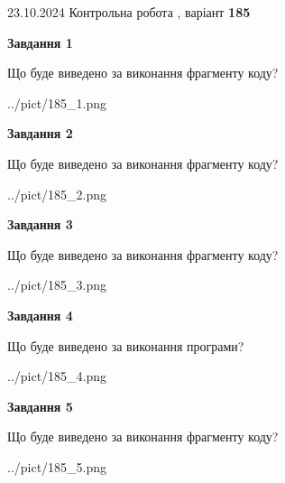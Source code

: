 \documentclass[12pt, ukrainian]{article}
\begin{document}
{\Large{23.10.2024 Контрольна робота , варіант  \No \textbf { 185 }\par}}
{
\begin {large}
{\begin {center}\textbf{Завдання 1}\end {center}}

Що буде виведено за виконання фрагменту коду?\par
\begin{center}
	{../pict/185_1.png}
\end{center}
\newpage

{\begin {center}\textbf{Завдання 2}\end {center}}

Що буде виведено за виконання фрагменту коду?\par
\begin{center}
	{../pict/185_2.png}
\end{center}
\newpage

{\begin {center}\textbf{Завдання 3}\end {center}}

Що буде виведено за виконання фрагменту коду?\par
\begin{center}
	{../pict/185_3.png}
\end{center}
\newpage

{\begin {center}\textbf{Завдання 4}\end {center}}

Що буде виведено за виконання програми?\par
\begin{center}
	{../pict/185_4.png}
\end{center}
\newpage

{\begin {center}\textbf{Завдання 5}\end {center}}

Що буде виведено за виконання фрагменту коду?\par
\begin{center}
	{../pict/185_5.png}
\end{center}
\newpage


\end{large}}
\end{document}
